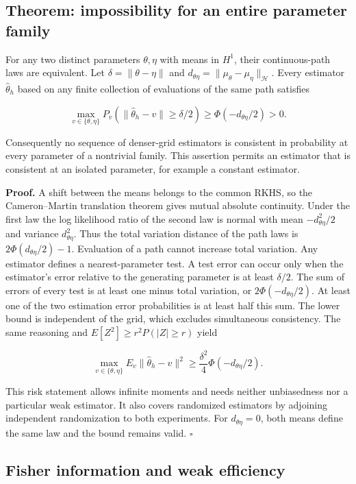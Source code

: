 \documentclass[
  11pt,
]{article}
\begin{document}
\subsection{Theorem: impossibility for an entire parameter
family}\label{theorem-impossibility-for-an-entire-parameter-family}

For any two distinct parameters \(\theta,\eta\) with means in \(H^1\),
their continuous-path laws are equivalent. Let
\(\delta=\|\theta-\eta\|\) and
\(d_{\theta\eta}=\|\mu_\theta-\mu_\eta\|_{\mathcal H}\). Every estimator
\(\widehat\theta_h\) based on any finite collection of evaluations of
the same path satisfies

\[
\max_{v\in\{\theta,\eta\}}P_v\left(\|\widehat\theta_h-v\|\geq\delta/2\right)\geq\Phi(-d_{\theta\eta}/2)>0.
\]

Consequently no sequence of denser-grid estimators is consistent in
probability at every parameter of a nontrivial family. This assertion
permits an estimator that is consistent at an isolated parameter, for
example a constant estimator.

\textbf{Proof.} A shift between the means belongs to the common RKHS, so
the Cameron--Martin translation theorem gives mutual absolute
continuity. Under the first law the log likelihood ratio of the second
law is normal with mean \(-d_{\theta\eta}^2/2\) and variance
\(d_{\theta\eta}^2\). Thus the total variation distance of the path laws
is \(2\Phi(d_{\theta\eta}/2)-1\). Evaluation of a path cannot increase
total variation. Any estimator defines a nearest-parameter test. A test
error can occur only when the estimator's error relative to the
generating parameter is at least \(\delta/2\). The sum of errors of
every test is at least one minus total variation, or
\(2\Phi(-d_{\theta\eta}/2)\). At least one of the two estimation error
probabilities is at least half this sum. The lower bound is independent
of the grid, which excludes simultaneous consistency. The same reasoning
and \(E[Z^2]\geq r^2P(|Z|\geq r)\) yield

\[
\max_{v\in\{\theta,\eta\}}E_v\|\widehat\theta_h-v\|^2\geq\frac{\delta^2}{4}\Phi(-d_{\theta\eta}/2).
\]

This risk statement allows infinite moments and needs neither
unbiasedness nor a particular weak estimator. It also covers randomized
estimators by adjoining independent randomization to both experiments.
For \(d_{\theta\eta}=0\), both means define the same law and the bound
remains valid. \(\square\)

\subsection{Fisher information and weak
efficiency}\label{fisher-information-and-weak-efficiency}
\end{document}
